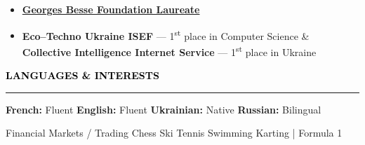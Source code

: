 \documentclass[10pt,english,french]{article}
\newcommand{\chessIcon}[1][black]{\textcolor{#1}{\faChess}}
\newcommand{\skiIcon}[1][black]{\textcolor{#1}{\faSkiing}}
\newcommand{\cryptoIcon}[1][black]{\textcolor{#1}{\faBitcoin}}
\newcommand{\swimmingIcon}[1][black]{\textcolor{#1}{\faSwimmer}}
\newcommand{\mountainsIcon}[1][black]{\textcolor{#1}{\faMountain}}
\newcommand{\speechBubbleIcon}[1][black]{\textcolor{#1}{\faComment}}
\newcommand{\tradingIcon}[1][black]{\textcolor{#1}{\faChartBar}}
\newcommand{\tennisIcon}[1][black]{\textcolor{#1}{\faBaseballBall}}
\newcommand{\flagIcon}[1][black]{\textcolor{#1}{\faFlagCheckered}}
\newlength{\mpwidth}
\newcommand{\cvsection}[1]{
    \vspace{4pt}
    \textbf{\fontsize{9pt}{10pt}\selectfont \textcolor{black}{#1}}
    \vspace{6pt}
    \hrule
    \vspace{6pt}
}
\newcommand{\cvtextnotab}[1]{
    \parbox{1\mpwidth}{#1}
}
\begin{document}
\vspace{-6pt}
\begin{itemize}[leftmargin=0.35cm, label=\textbullet, itemsep=0.15em]
    \item \textbf{\href{https://www.fondationbesse.com/}{Georges Besse Foundation Laureate}}
    \item \textbf{Eco\hspace{3pt}--\hspace{3pt}Techno Ukraine ISEF} --- 1\textsuperscript{st} place in Computer Science \& \textbf{Collective Intelligence Internet Service} --- 1\textsuperscript{st} place in Ukraine
\end{itemize}

\vspace{-5pt}
\cvsection{\speechBubbleIcon[black]\hspace{4pt}LANGUAGES \& INTERESTS}

\vspace{-3pt}
\cvtextnotab{\textbf{French\!:} Fluent \hspace{12pt} \textbf{English\!:} Fluent \hspace{12pt} \textbf{Ukrainian\!:} Native \hspace{20pt} \textbf{Russian\!:} Bilingual}

\vspace{-8pt}
\cvtextnotab{
    \tradingIcon[black]\hspace{2pt}Financial Markets / Trading \hspace{12pt}
    \chessIcon[black]\hspace{2pt}Chess \hspace{12pt}
    \skiIcon[black]\hspace{2pt}Ski \hspace{12pt}
    \tennisIcon[black]\hspace{2pt}Tennis \hspace{12pt}
    \swimmingIcon[black]\hspace{2pt}Swimming \hspace{12pt}
    \flagIcon[black]\hspace{2pt}Karting | Formula 1
}
\end{document}
